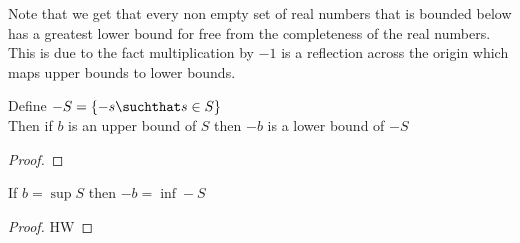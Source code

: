 \documentclass[answers,12pt,addpoints]{exam}
\begin{document}
Note that we get that every non empty set of real numbers that is bounded below has a greatest lower bound for free from the completeness of the real numbers. \\
This is due to the fact multiplication by $-1$ is a reflection across the origin which maps upper bounds to lower bounds. \\
\begin{theorem}
    Define $-S = \{-s \suchthat s \in S\}$ \\
    Then if $b$ is an upper bound of $S$ then $-b$ is a lower bound of $-S$ \\
    \begin{proof}
        
    \end{proof}
\end{theorem}
\begin{theorem}
    If $b = \sup S$ then $-b = \inf -S$
    \begin{proof}
        HW
    \end{proof}
\end{theorem}
\begin{theorem}
    
\end{theorem}
\begin{theorem}
    
\end{theorem}
\end{document}
